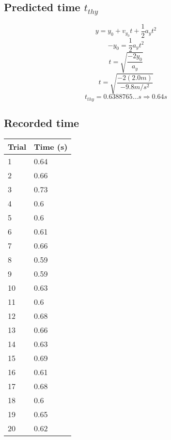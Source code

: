 \documentclass[11pt, letterpaper, includehead]{article}
\begin{document}
\subsection{Predicted time $t_{thy}$} %
$$y       = y_0 + v_{y_0}t + \frac{1}{2}a_yt^2$$
$$-y_0    = \frac{1}{2}a_yt^2$$
$$t       = \sqrt{\frac{-2y_0}{a_y}}$$
$$t       = \sqrt{\frac{-2(2.0m)}{-9.8m/s^2}}$$
$${t_{thy} = 0.6388765...s \Rightarrow  \boxed{0.64s}}$$

\subsection{Recorded time} %
\begin{center}
  \begin{tabular}{|  m{2cm} | m{2cm} | }
    \hline
    \textbf{Trial} & \textbf{Time (s)} \\
    \hline
    1              & 0.64              \\
    \hline
    2              & 0.66              \\
    \hline
    3              & 0.73              \\
    \hline
    4              & 0.6               \\
    \hline
    5              & 0.6               \\
    \hline
    6              & 0.61              \\
    \hline
    7              & 0.66              \\
    \hline
    8              & 0.59              \\
    \hline
    9              & 0.59              \\
    \hline
    10             & 0.63              \\
    \hline
    11             & 0.6               \\
    \hline
    12             & 0.68              \\
    \hline
    13             & 0.66              \\
    \hline
    14             & 0.63              \\
    \hline
    15             & 0.69              \\
    \hline
    16             & 0.61              \\
    \hline
    17             & 0.68              \\
    \hline
    18             & 0.6               \\
    \hline
    19             & 0.65              \\
    \hline
    20             & 0.62              \\
    \hline
  \end{tabular}
\end{center}
\end{document}
